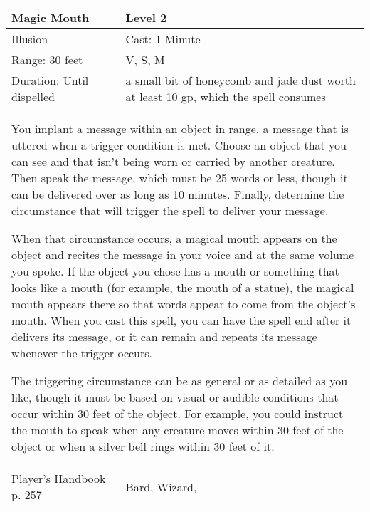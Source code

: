\documentclass[11pt]{report}
\begin{document}
\begin{table}[H]
	\begin{tabular}{||p{6cm}|p{6cm}||}
		\hline\hline
		\bf{Magic Mouth} & Level 2\\ \hline
		Illusion & Cast: 1 Minute\\ \hline
		Range: 30 feet & V, S, M\\ \hline
		Duration: Until dispelled & a small bit of honeycomb and jade dust worth at least 10 gp, which the spell consumes\\ \hline
		\multicolumn{2}{||p{12cm}||}{You implant a message within an object in range, a message that is uttered when a trigger condition is met.
Choose an object that you can see and that isn’t being worn or carried by another creature. Then speak the message, which must be 25 words or less, though it can be delivered over as long as 10 minutes. Finally, determine the circumstance that will trigger the spell to deliver your message.

When that circumstance occurs, a magical mouth appears on the object and recites the message in your voice and at the same volume you spoke. If the object you chose has a mouth or something that looks like a mouth (for example, the mouth of a statue), the magical mouth appears there so that words appear to come from the object’s mouth. When you cast this spell, you can have the spell end after it delivers its message, or it can remain and repeats its message whenever the trigger occurs.

The triggering circumstance can be as general or as detailed as you like, though it must be based on visual or audible conditions that occur within 30 feet of the object. For example, you could instruct the mouth to speak when any creature moves within 30 feet of the object or when a silver bell rings within 30 feet of it.}\\ \hline
Player's Handbook p. 257 & Bard, Wizard, \\ \hline\hline
	\end{tabular}
\end{table}
\end{document}
